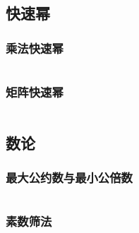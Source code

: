 \documentclass[a4paper,11pt]{article}
\begin{document}
\newpage
\subsection{快速幂}
\subsubsection{乘法快速幂}
\inputminted[linenos,autogobble]{java}{math/quick-pow.java}

\subsubsection{矩阵快速幂}
\inputminted[linenos,autogobble]{java}{math/matrix-quick-pow.java}

\newpage
\subsection{数论}
\subsubsection{最大公约数与最小公倍数}
\inputminted[linenos,autogobble]{java}{math/gcd-lcm.java}

\subsubsection{素数筛法}
\inputminted[linenos,autogobble]{java}{math/prime-sieve.java}
\end{document}
